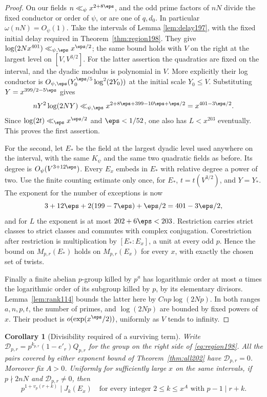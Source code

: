 \documentclass[a4paper,11pt]{article}
\newtheorem{corollary}[proposition]{Corollary}
\theoremstyle{definition}
\theoremstyle{remark}
\numberwithin{equation}{section}
\begin{document}
\begin{proof}
On our fields \(n\ll_\psi x^{2+8\eps}\), and the odd prime factors
of \(nN\) divide the fixed conductor or order of \(\psi\), or are
one of \(q,d_0\). In particular \(\omega(nN)=O_\psi(1)\).
Take the intervals of
Lemma \ref{lem:delay197},
with the fixed initial delay required in Theorem~\ref{thm:region198}.
They give \(\log(2N x^{401})\ll_{\psi,\eps}x^{\eps/2}\);
the same bound holds with \(V\) on the right at the largest
level on \([V,V^{3/2}]\). For the latter assertion the quadratics
are fixed on the interval, and the dyadic modulus is polynomial in
\(V\). More explicitly their log conductor is
\(O_{\psi,\eps}(Y_0^{\eps/5}\log^2(2Y_0))\) at the initial
scale \(Y_0\le V\). Substituting \(Y=x^{399/2-5\eps}\) gives
\[
 nY^2\log(2NY)\ll_{\psi,\eps}
                 x^{2+8\eps+399-10\eps+\eps/2}
                    =x^{401-3\eps/2}.
\]
Since \(\log(2t)\ll_\eps x^{\eps/2}\) and \(\eps<1/52\), one
also has \(L<x^{203}\) eventually. This proves the first assertion.

For the second, let \(E_*\) be the field at the largest dyadic
level used anywhere on the interval, with the same \(K_\psi\)
and the same two quadratic fields as before. Its degree is
\(O_\psi(V^{3+12\eps})\). Every \(E_x\) embeds in \(E_*\) with
relative degree a power of two. Use the finite counting estimate
only once, for \(E_*\), \(t=t(V^{3/2})\), and \(Y=Y_*\).
The exponent for the number of exceptions is now
\[
             3+12\eps+2(199-7\eps)+\eps/2=401-3\eps/2,
\]
and for \(L\) the exponent is at most \(202+6\eps<203\).
Restriction carries strict classes to strict classes and commutes
with complex conjugation. Corestriction after restriction is
multiplication by \([E_*:E_x]\), a unit at every odd \(p\). Hence
the bound on \(M_{p,r}(E_*)\) holds on \(M_{p,r}(E_x)\) for
every \(x\), with exactly the chosen set of twists.

Finally a finite abelian \(p\)-group killed by \(p^a\) has
logarithmic order at most \(a\) times the logarithmic order of
its subgroup killed by \(p\), by its elementary divisors.
Lemma~\ref{lem:rank114} bounds the latter here by
\(Cnp\log(2Np)\). In both ranges \(a,n,p,t\), the number of
primes, and \(\log(2Np)\) are bounded by fixed powers of \(x\).
Their product is \(o(\exp(x^\eps/2))\), uniformly as \(V\)
tends to infinity.
\end{proof}

\begin{corollary}[Divisibility required of a surviving term]
\label{cor:weights202}
Write \(\mathcal D_{p,r}=p^{k_{p,r}}(1-e'_r)Q_{p,r}\) for the group on
the right side of \eqref{eq:region198}. All the pairs covered by
either exponent bound of Theorem~\ref{thm:all202} have
\(\mathcal D_{p,r}=0\). Moreover fix \(A>0\). Uniformly for sufficiently
large \(x\) on the same intervals, if \(p\nmid 2nN\) and
\(\mathcal D_{p,r}\ne0\), then
\[
         p^{1+v_p(r+k)}\mid J_k(E_x)
 \quad\text{for every integer }2\le k\le x^A
                    \text{ with }p-1\mid r+k .
\]
\end{corollary}
\end{document}
